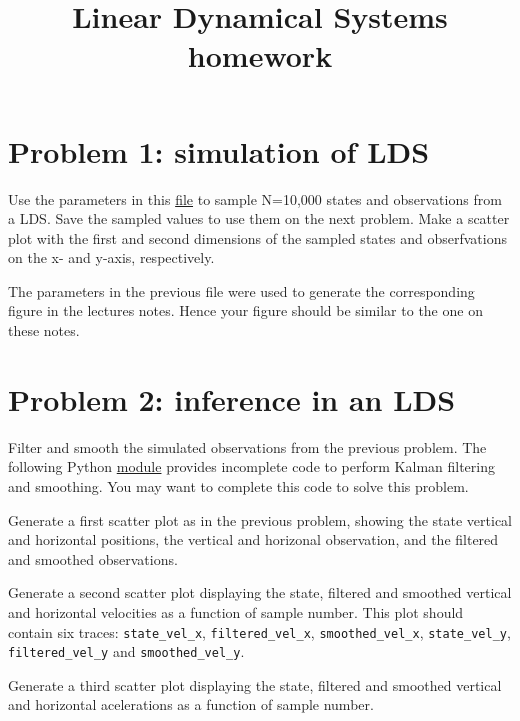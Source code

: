 \documentclass{article}
\title{Linear Dynamical Systems homework}
\author{}
\date{}
\begin{document}
\maketitle

\section*{Problem 1: simulation of LDS}

Use the parameters in this
\href{https://github.com/joacorapela/probabilisticModelingCourse/blob/master/lds/data/00000002_simulation_params.npz}{file}
to sample N=10,000 states and observations from a LDS. Save the sampled values
to use them on the next problem. Make a scatter plot with the first and second
dimensions of the sampled states and obserfvations on the x- and y-axis,
respectively.

The parameters in the previous file were used to generate the corresponding
figure in the lectures notes. Hence your figure should be similar to the one on
these notes.

\section*{Problem 2: inference in an LDS}

Filter and smooth the simulated observations from the previous problem. The
following Python
\href{https://github.com/joacorapela/probabilisticModelingCourse/blob/master/lds/code/src/inference.py}{module}
provides incomplete code to perform Kalman filtering and smoothing. You may
want to complete this code to solve this problem.

Generate a first scatter plot as in the previous problem, showing the state
vertical and horizontal positions, the vertical and horizonal observation, and
the filtered and smoothed observations.

Generate a second scatter plot displaying the state, filtered and smoothed
vertical and horizontal velocities as a function of sample number. This plot
should contain six traces: \texttt{state\_vel\_x}, \texttt{filtered\_vel\_x},
\texttt{smoothed\_vel\_x}, \texttt{state\_vel\_y}, \texttt{filtered\_vel\_y} and
\texttt{smoothed\_vel\_y}.

Generate a third scatter plot displaying the state, filtered and smoothed
vertical and horizontal acelerations as a function of sample number.
\end{document}

